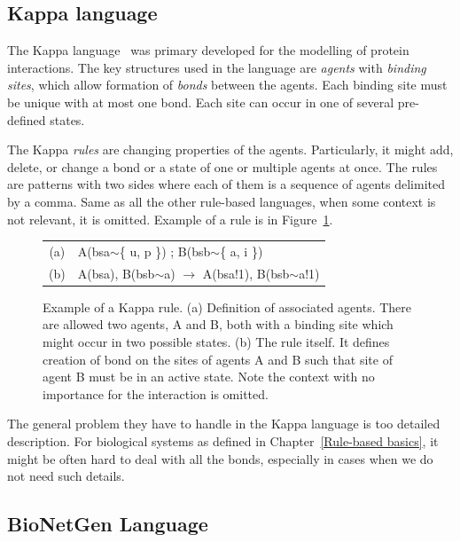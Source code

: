 \documentclass[12pt, twoside]{fithesis2} %
\begin{document}
\subsection{Kappa language}
\label{kappa}

The Kappa language~\cite{kappa_formal} was primary developed for the modelling of protein interactions. The key structures used in the language are \emph{agents} with \emph{binding sites}, which allow formation of \emph{bonds} between the agents. Each binding site must be unique with at most one bond. Each site can occur in one of several pre-defined states.

The Kappa \emph{rules} are changing properties of the agents. Particularly, it might add, delete, or change a bond or a state of one or multiple agents at once. The rules are patterns with two sides where each of them is a sequence of agents delimited by a comma. Same as all the other rule-based languages, when some context is not relevant, it is omitted. Example of a rule is in Figure~\ref{kappa-rule}.

\begin{figure}[!h]
\begin{center}
\begin{tabular}{c l}
(a) & A(bsa$\sim$\{ u, p \}) ; B(bsb$\sim$\{ a, i \}) \\
(b) & A(bsa), B(bsb$\sim$a) $\rightarrow$ A(bsa!1), B(bsb$\sim$a!1) \\
\end{tabular}
\end{center}
\caption{Example of a Kappa rule. (a) Definition of associated agents. There are allowed two agents, A and B, both with a binding site which might occur in two possible states. (b) The rule itself. It defines creation of bond on the sites of agents A and B such that site of agent B must be in an active state. Note the context with no importance for the interaction is omitted.}\label{kappa-rule}
\end{figure}

The general problem they have to handle in the Kappa language is too detailed description. For biological systems as defined in Chapter~\ref{Rule-based basics}, it might be often hard to deal with all the bonds, especially in cases when we do not need such details.

\subsection{BioNetGen Language}
\label{bngl}
\end{document}
